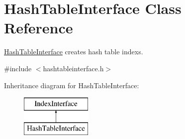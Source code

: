 \hypertarget{class_hash_table_interface}{}\section{Hash\+Table\+Interface Class Reference}
\label{class_hash_table_interface}


\hyperlink{class_hash_table_interface}{Hash\+Table\+Interface} creates hash table index\textquotesingle{}s.  




{\ttfamily \#include $<$hashtableinterface.\+h$>$}

Inheritance diagram for Hash\+Table\+Interface\+:\begin{figure}[H]
\begin{center}
\leavevmode
\includegraphics[height=2.000000cm]{class_hash_table_interface}
\end{center}
\end{figure}
